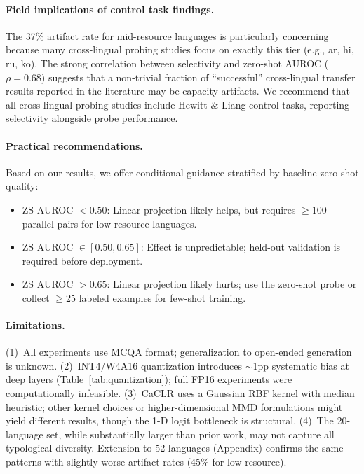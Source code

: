 \documentclass[11pt,a4paper]{article}
\newcommand{\auroc}{AUROC}
\begin{document}
\paragraph{Field implications of control task findings.}
The 37\% artifact rate for mid-resource languages is particularly concerning because many cross-lingual probing studies focus on exactly this tier (e.g., ar, hi, ru, ko).
The strong correlation between selectivity and zero-shot \auroc{} ($\rho = 0.68$) suggests that a non-trivial fraction of ``successful'' cross-lingual transfer results reported in the literature may be capacity artifacts.
We recommend that all cross-lingual probing studies include Hewitt \& Liang control tasks, reporting selectivity alongside probe performance.

\paragraph{Practical recommendations.}
Based on our results, we offer conditional guidance stratified by baseline zero-shot quality:
\begin{itemize}
    \item ZS \auroc{} $< 0.50$: Linear projection likely helps, but requires $\geq$100 parallel pairs for low-resource languages.
    \item ZS \auroc{} $\in [0.50, 0.65]$: Effect is unpredictable; held-out validation is required before deployment.
    \item ZS \auroc{} $> 0.65$: Linear projection likely hurts; use the zero-shot probe or collect $\geq$25 labeled examples for few-shot training.
\end{itemize}

\paragraph{Limitations.}
(1)~All experiments use MCQA format; generalization to open-ended generation is unknown.
(2)~INT4/W4A16 quantization introduces $\sim$1pp systematic bias at deep layers (Table~\ref{tab:quantization}); full FP16 experiments were computationally infeasible.
(3)~CaCLR uses a Gaussian RBF kernel with median heuristic; other kernel choices or higher-dimensional MMD formulations might yield different results, though the 1-D logit bottleneck is structural.
(4)~The 20-language set, while substantially larger than prior work, may not capture all typological diversity.
Extension to 52 languages (Appendix) confirms the same patterns with slightly worse artifact rates (45\% for low-resource).
\end{document}
